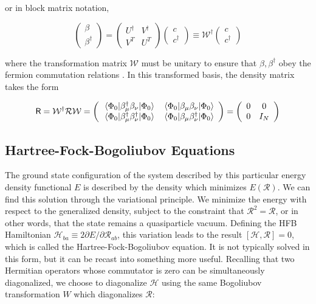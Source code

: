 \noindent or in block matrix notation,

\begin{equation}
\left(\begin{array}{c} \beta \\ \beta^\dagger\end{array}\right) = 
\left(\begin{array}{cc} U^\dagger & V^\dagger \\ V^T & U^T \end{array}\right)
\left(\begin{array}{c} c \\ c^\dagger\end{array}\right)
\equiv \mathcal{W}^\dagger \left(\begin{array}{c} c \\ c^\dagger\end{array}\right)
\end{equation}

\noindent where the transformation matrix $\mathcal{W}$ must be unitary to ensure that $\beta, \beta^\dagger$ obey the fermion commutation relations \cite{Ring1980}. In this transformed basis, the density matrix takes the form 

\begin{equation}
\mathsf{R} = \mathcal{W}^\dagger\mathcal{R}\mathcal{W} = 
\left(\begin{array}{cc}
\expval{\beta_\mu^\dagger \beta_\nu}{\Phi_0} & \expval{\beta_\mu \beta_\nu}{\Phi_0} \\
\expval{\beta_\mu^\dagger \beta_\nu^\dagger}{\Phi_0} & \expval{\beta_\mu \beta_\nu^\dagger}{\Phi_0}
\end{array}\right) = 
\left(\begin{array}{cc}
0 & 0 \\
0 & I_N
\end{array}\right)
\end{equation}


\subsection{Hartree-Fock-Bogoliubov Equations}

The ground state configuration of the system described by this particular energy density functional $E$ is described by the density which minimizes $E(\mathcal{R})$. We can find this solution through the variational principle. We minimize the energy with respect to the generalized density, subject to the constraint that $\mathcal{R}^2=\mathcal{R}$, or in other words, that the state remains a quasiparticle vacuum. Defining the HFB Hamiltonian $\mathcal{H}_{ba} \equiv 2 \partial E/\partial \mathcal{R}_{ab}$, this variation leads to the result $\left[\mathcal{H},\mathcal{R}\right]=0$, which is called the Hartree-Fock-Bogoliubov equation. It is not typically solved in this form, but it can be recast into something more useful. Recalling that two Hermitian operators whose commutator is zero can be simultaneously diagonalized, we choose to diagonalize $\mathcal{H}$ using the same Bogoliubov transformation $W$ which diagonalizes $\mathcal{R}$:

